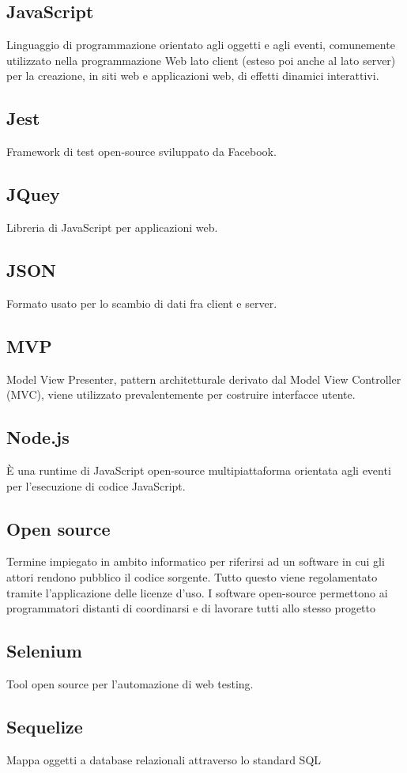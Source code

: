 \documentclass[../manuale_sviluppatore.tex]{subfiles}
\begin{document}
\subsection*{JavaScript}
{}
Linguaggio di programmazione orientato agli oggetti e agli eventi, comunemente utilizzato nella programmazione Web lato client (esteso poi anche al lato server) per la creazione, in siti web e applicazioni web, di effetti dinamici interattivi.

\subsection*{Jest}
{}
Framework di test open-source sviluppato da Facebook.

\subsection*{JQuey}
{}
Libreria di JavaScript per applicazioni web.

\subsection*{JSON}
{}
Formato usato per lo scambio di dati fra client e server.

\subsection*{MVP}
{}
Model View Presenter, pattern architetturale derivato dal Model View Controller (MVC), viene utilizzato prevalentemente per costruire interfacce utente.

\subsection*{Node.js}
{}
È una runtime di JavaScript open-source multipiattaforma orientata agli eventi per l’esecuzione di codice JavaScript.

\subsection*{Open source}
{}
Termine impiegato in ambito informatico per riferirsi ad un software in cui gli attori rendono pubblico il codice sorgente. 
Tutto questo viene regolamentato tramite l’applicazione delle licenze d’uso. 
I software open-source permettono ai programmatori distanti di coordinarsi e di lavorare tutti allo stesso progetto

\subsection*{Selenium}
{}
Tool open source per l'automazione di web testing.

\subsection*{Sequelize}
{}
Mappa oggetti a database relazionali attraverso lo standard SQL
\end{document}
